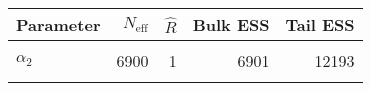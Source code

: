\begin{table}[!h]
\centering
\begin{tabular}{>{\raggedright\arraybackslash}p{2cm}rrrr}
\toprule
Parameter & $N_{\text{eff}}$ & $\widehat{R}$ & Bulk ESS & Tail ESS\\
\midrule
\cellcolor{gray!6}{$\alpha_{0}$} & \cellcolor{gray!6}{5990} & \cellcolor{gray!6}{1} & \cellcolor{gray!6}{5985} & \cellcolor{gray!6}{10960}\\
$\alpha_{2}$ & 6900 & 1 & 6901 & 12193\\
\cellcolor{gray!6}{$\rho$} & \cellcolor{gray!6}{4737} & \cellcolor{gray!6}{1} & \cellcolor{gray!6}{4767} & \cellcolor{gray!6}{4389}\\
\bottomrule
\end{tabular}
\end{table}